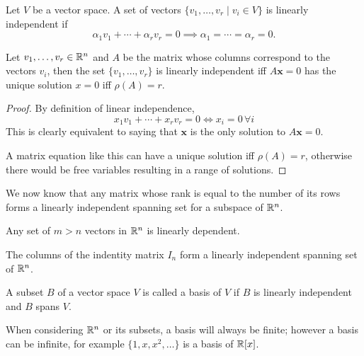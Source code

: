 \documentclass[a4paper,10pt]{article}
\begin{document}
\begin{defn}
	Let $V$ be a vector space. A set of vectors
	$\{v_1, \ldots, v_r \mid v_i \in V \}$
	is linearly independent if
	\[
		\alpha_1 v_1 + \cdots + \alpha_r v_r = 0
		\implies \alpha_1 = \cdots = \alpha_r = 0.
	\]
\end{defn}

\begin{thm}
	Let $v_1, \ldots, v_r \in \mathbb{R}^n$ and $A$ be the matrix whose
	columns correspond to the vectors $v_i$, then the set
	$\{v_1, \ldots, v_r\}$ is linearly independent iff
	$A\bm{x} = 0$ has the unique solution $x = 0$ iff $\rho(A) = r$.
\end{thm}

\begin{proof}
	By definition of linear independence,
	\[
		x_1 v_1 + \cdots + x_r v_r = 0
		\iff
		x_i = 0 \, \forall i
	\]
	This is clearly equivalent to saying that $\bm x$ is the
	only solution to $A\bm x = 0$.

	A matrix equation like this can have a unique solution iff
	$\rho(A) = r$, otherwise there would be free variables resulting
	in a range of solutions.
\end{proof}

We now know that any matrix whose rank is equal to the number of its
rows forms a linearly independent spanning set for a subspace of
$\mathbb{R}^n$.

\begin{cor}
	Any set of $m > n$ vectors in $\mathbb{R}^n$ is linearly dependent.
\end{cor}

\begin{cor}
	The columns of the indentity matrix $I_n$ form a linearly
	independent spanning set of $\mathbb{R}^n$.
\end{cor}

\begin{defn}[Basis]
	A subset $B$ of a vector space $V$ is called a basis of $V$ if $B$ is linearly independent and $B$ spans $V$.
\end{defn}

\begin{rem}
	When considering $\mathbb{R}^n$ or its subsets, a basis will always be
	finite; however a basis can be infinite, for example
	$\{1, x, x^2, \ldots\}$ is a basis of $\mathbb{R}[x]$.
\end{rem}
\end{document}
